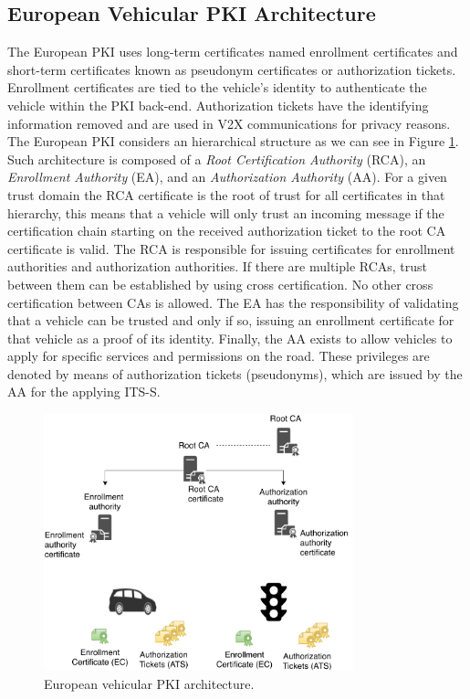 \subsection{European Vehicular PKI Architecture}
\label{section:european_pki}

The European PKI uses long-term certificates named enrollment certificates and short-term certificates known as pseudonym certificates or authorization tickets. Enrollment certificates are tied to the vehicle's identity to authenticate the vehicle within the PKI back-end. Authorization tickets have the identifying information removed and are used in V2X communications for privacy reasons. The European PKI considers an hierarchical structure as we can see in Figure \ref{fig:ETSI_PKI}. Such architecture is composed of a \textit{Root Certification Authority} (RCA), an \textit{Enrollment Authority} (EA), and an \textit{Authorization Authority} (AA). For a given trust domain the RCA certificate is the root of trust for all certificates in that hierarchy, this means that a vehicle will only trust an incoming message if the certification chain starting on the received authorization ticket to the root CA certificate is valid. The RCA is responsible for issuing certificates for enrollment authorities and authorization authorities. If there are multiple RCAs, trust between them can be established by using cross certification. No other cross certification between CAs is allowed. The EA has the responsibility of validating that a vehicle can be trusted and only if so, issuing an enrollment certificate for that vehicle as a proof of its identity. Finally, the AA exists to allow vehicles to apply for specific services and permissions on the road. These privileges are denoted by means of authorization tickets (pseudonyms), which are issued by the AA for the applying ITS-S.



\begin{figure}
	\centering
	\includegraphics[width=0.8\textwidth]{Figures/ETSI_PKI.pdf}
	\caption{\label{fig:ETSI_PKI}European vehicular PKI architecture.}
\end{figure}

